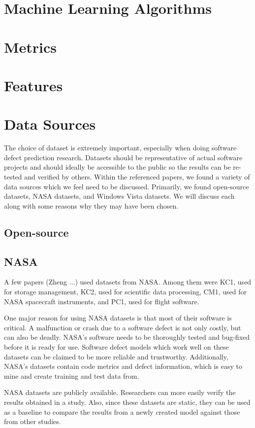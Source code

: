 \documentclass{sig-alternate-05-2015}
\begin{document}
\section{Machine Learning Algorithms}

\section{Metrics}

\section{Features}

\section{Data Sources}
The choice of dataset is extremely important, especially when doing software defect prediction research. Datasets should be representative of actual software projects and should ideally be accessible to the public so the results can be re-tested and verified by others. Within the referenced papers, we found a variety of data sources which we feel need to be discussed. Primarily, we found open-source datasets, NASA datasets, and Windows Vista datasets. We will discuss each along with some reasons why they may have been chosen.
\subsection{Open-source}
\subsection{NASA}
A few papers (Zheng \cite{zheng2010}...) used datasets from NASA. Among them were KC1, used for storage management, KC2, used for scientific data processing, CM1, used for NASA spacecraft instruments, and PC1, used for flight software.

One major reason for using NASA datasets is that most of their software is critical. A malfunction or crash due to a software defect is not only costly, but can also be deadly. NASA's software needs to be thoroughly tested and bug-fixed before it is ready for use. Software defect models which work well on these datasets can be claimed to be more reliable and trustworthy. Additionally, NASA's datasets contain code metrics and defect information, which is easy to mine and create training and test data from.

NASA datasets are publicly available. Researchers can more easily verify the results obtained in a study. Also, since these datasets are static, they can be used as a baseline to compare the results from a newly created model against those from other studies.
\end{document}
